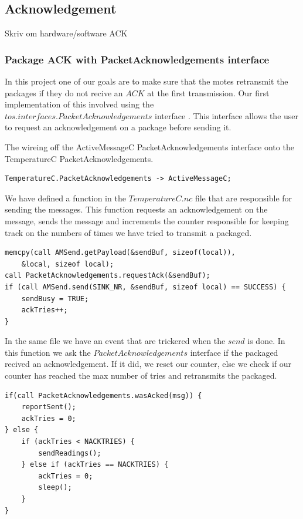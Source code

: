 \subsection{Acknowledgement}
Skriv om hardware/software ACK

\subsubsection{Package ACK with PacketAcknowledgements interface}

In this project one of our goals are to make sure that the motes retransmit the
packages if they do not recive an $ACK$ at the first transmission. Our first
implementation of this involved using the
$tos.interfaces.PacketAcknowledgements$ interface \cite{telosbAPI}. This interface allows the
user to request an acknowledgement on a package before sending it.

The wireing off the ActiveMessageC PacketAcknowledgements interface onto the
TemperatureC PacketAcknowledgements.

\begin{lstlisting}[caption={TemperatureAppC.nc}]
 TemperatureC.PacketAcknowledgements -> ActiveMessageC;
\end{lstlisting}

We have defined a function in the $TemperatureC.nc$ file that are responsible
for sending the messages. This function requests an acknowledgement on the
message, sends the message and increments the counter responsible for keeping
track on the numbers of times we have tried to transmit a packaged.

\begin{lstlisting}[caption={TemperatureC.nc $\rightarrow$ sendReadings()}]
memcpy(call AMSend.getPayload(&sendBuf, sizeof(local)),
    &local, sizeof local);
call PacketAcknowledgements.requestAck(&sendBuf);
if (call AMSend.send(SINK_NR, &sendBuf, sizeof local) == SUCCESS) {
    sendBusy = TRUE;
    ackTries++;
}
\end{lstlisting}

In the same file we have an event that are trickered when the $send$ is done.
In this function we ask the $PacketAcknowledgements$ interface if the packaged
recived an acknowledgement. If it did, we reset our counter, else we check if
our counter has reached the max number of tries and retransmits the packaged.

\begin{lstlisting}[caption={TemperatureC.nc $\rightarrow$ AMSend.sendDone()}]
if(call PacketAcknowledgements.wasAcked(msg)) {
    reportSent();
    ackTries = 0;
} else {
    if (ackTries < NACKTRIES) {
        sendReadings();
    } else if (ackTries == NACKTRIES) {
        ackTries = 0;
        sleep();
    }
}
\end{lstlisting}

